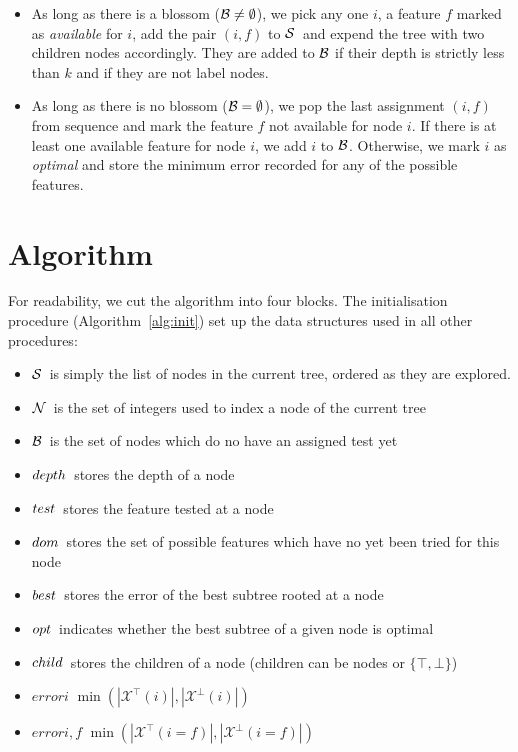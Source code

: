 \documentclass{article}
\newcommand{\setex}[1]{\ensuremath{{\mathcal X}^{#1}}\xspace}
\newcommand{\posex}{{\setex{\top}}\xspace}
\newcommand{\negex}{{\setex{\bot}}\xspace}
\newcommand{\nodes}[0]{\ensuremath{{\cal N}}}
\newcommand{\blossom}[0]{\ensuremath{{\cal B}}}
\newcommand{\sequence}[0]{\ensuremath{{\cal S}}}
\newcommand{\anode}[0]{\ensuremath{i}}
\newcommand{\afeat}[0]{\ensuremath{f}}
\newcommand{\error}[0]{\ensuremath{error}}
\newcommand{\depth}[1][]{\ensuremath{\ifthenelse{\equal{#1}{}}{depth}{depth({#1})}}}
\newcommand{\test}[1][]{\ensuremath{\ifthenelse{\equal{#1}{}}{test}{test({#1})}}}
\newcommand{\dom}[1][]{\ensuremath{\ifthenelse{\equal{#1}{}}{dom}{dom({#1})}}}
\newcommand{\best}[1][]{\ensuremath{\ifthenelse{\equal{#1}{}}{{best}}{{best({#1})}}}}
\newcommand{\opt}[1][]{\ensuremath{\ifthenelse{\equal{#1}{}}{opt}{opt({#1})}}}
\newcommand{\child}[1][]{\ensuremath{\ifthenelse{\equal{#1}{}}{{child}}{{child({{#1}})}}}}
\begin{document}
\begin{itemize}
	\item As long as there is a blossom ($\blossom \neq \emptyset$), we pick any one $\anode$, a feature $\afeat$ marked as \emph{available} for \anode, add the pair $(\anode,\afeat)$ to \sequence\ and expend the tree with two children nodes accordingly. 
	They are added to $\blossom$ if their depth is strictly less than $k$ and if they are not label nodes.

\item As long as there is no blossom ($\blossom = \emptyset$), we pop the last assignment $(\anode,\afeat)$ from sequence
and mark the feature $f$ not available for node $\anode$. If there is at least one available feature for node $\anode$, we add $\anode$ to $\blossom$. 
Otherwise, we mark $\anode$ as \emph{optimal} and store the minimum error recorded for any of the possible features.

\end{itemize}

\clearpage

\section*{Algorithm}

For readability, we cut the algorithm into four blocks. The initialisation procedure (Algorithm~\ref{alg:init}) set up the data structures used in all other procedures:
\begin{itemize}
	\item \sequence\ is simply the list of nodes in the current tree, ordered as they are explored.
	\item \nodes\ is the set of integers used to index a node of the current tree
	\item \blossom\ is the set of nodes which do no have an assigned test yet
	\item \depth\ stores the depth of a node
	\item \test\ stores the feature tested at a node
	\item \dom\ stores the set of possible features which have no yet been tried for this node 
	\item \best\ stores the error of the best subtree rooted at a node 
	\item \opt\ indicates whether the best subtree of a given node is optimal
	\item \child\ stores the children of a node (children can be nodes or $\{\top, \bot\}$)
	\item $\error{\anode}$ $\min(|\posex(\anode)|,|\negex(\anode)|)$
	\item $\error{\anode,\afeat}$ $\min(|\posex(\anode=\afeat)|,|\negex(\anode=\afeat)|)$
\end{itemize}
\end{document}
